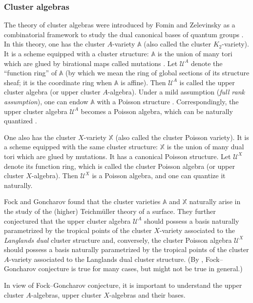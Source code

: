 \documentclass[pdftex]{sigma}
\newcommand{\upClAlg}{\mathcal{U}^A}
\newcommand{\XClAlg}{\mathcal{U}^X}
\newcommand{\AVar}{\mathbb{A}}
\newcommand{\XVar}{\mathbb{X}}
\numberwithin{equation}{section}
\begin{document}
\subsubsection*{Cluster algebras}

The theory of cluster algebras were introduced by Fomin and Zelevinsky
\cite{FominZelevinsky02} as a combinatorial framework to study the
dual canonical bases of quantum groups \cite{Kas:crystal,Lusztig90,Lusztig91}. In this theory, one has the cluster $A$-variety
$\AVar$ (also called the cluster $K_{2}$-variety). It is a scheme
equipped with a cluster structure: $\AVar$ is the union of many tori
which are glued by birational maps called mutations \cite{gross2013birational}.
Let $\upClAlg$ denote the ``function ring'' of $\AVar$ (by which
we mean the ring of global sections of its structure sheaf; it is
the coordinate ring when $\AVar$ is affine). Then $\upClAlg$ is
called the upper cluster algebra (or upper cluster $A$-algebra).
Under a mild assumption (\emph{full rank assumption}), one can endow
$\AVar$ with a Poisson structure \cite{GekhtmanShapiroVainshtein03,GekhtmanShapiroVainshtein05}.
Correspondingly, the upper cluster algebra $\upClAlg$ becomes a Poisson
algebra, which can be naturally quantized \cite{BerensteinZelevinsky05}.

One also has the cluster $X$-variety $\XVar$ (also called the cluster
Poisson variety). It is a scheme equipped with the same cluster structure:
$\XVar$ is the union of many dual tori which are glued by mutations.
It has a canonical Poisson structure. Let $\XClAlg$ denote its function
ring, which is called the cluster Poisson algebra (or upper cluster
$X$-algebra). Then $\XClAlg$ is a Poisson algebra, and one can quantize
it naturally.

Fock and Goncharov \cite{FockGoncharov06a,FockGoncharov09} found
that the cluster varieties $\AVar$ and $\XVar$ naturally arise in
the study of the (higher) Teichm\"uller theory of a surface. They further
conjectured that the upper cluster algebra $\upClAlg$ should possess
a basis naturally parametrized by the tropical points of the cluster
$X$-variety associated to the \emph{Langlands dual }cluster structure
and, conversely, the cluster Poisson algebra $\XClAlg$ should possess
a basis naturally parametrized by the tropical points of the cluster
$A$-variety associated to the Langlands dual cluster structure. (By
\cite{gross2018canonical}, Fock--Goncharov conjecture is true for
many cases, but might not be true in general.)

In view of Fock--Goncharov conjecture, it is important to understand
the upper cluster $A$-algebras, upper cluster $X$-algebras and their
bases.
\end{document}
